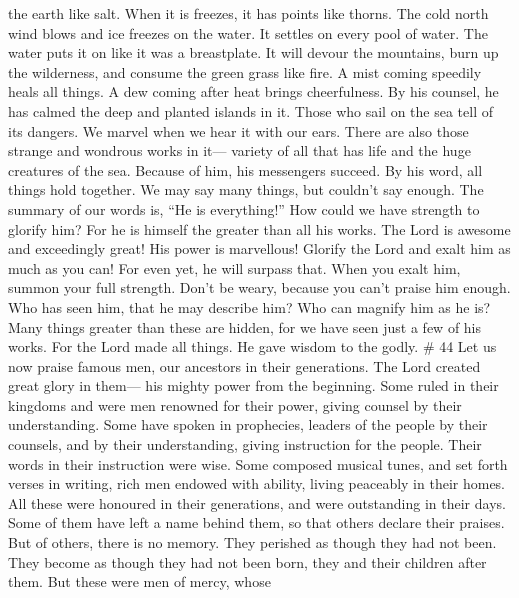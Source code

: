 the earth like salt. When it is freezes, it has points like thorns.
 The cold north wind blows and ice freezes on the water. It
settles on every pool of water. The water puts it on like it was a
breastplate.  It will devour the mountains, burn up the
wilderness, and consume the green grass like fire.  A mist
coming speedily heals all things. A dew coming after heat brings
cheerfulness.  By his counsel, he has calmed the deep and
planted islands in it.  Those who sail on the sea tell of
its dangers. We marvel when we hear it with our ears. 
There are also those strange and wondrous works in it--- variety of all
that has life and the huge creatures of the sea.  Because
of him, his messengers succeed. By his word, all things hold together.
 We may say many things, but couldn't say enough. The
summary of our words is, ``He is everything!''  How could
we have strength to glorify him? For he is himself the greater than all
his works.  The Lord is awesome and exceedingly great! His
power is marvellous!  Glorify the Lord and exalt him as
much as you can! For even yet, he will surpass that. When you exalt him,
summon your full strength. Don't be weary, because you can't praise him
enough.  Who has seen him, that he may describe him? Who
can magnify him as he is?  Many things greater than these
are hidden, for we have seen just a few of his works.  For
the Lord made all things. He gave wisdom to the godly. \# 44
 Let us now praise famous men, our ancestors in their
generations.  The Lord created great glory in them--- his
mighty power from the beginning.  Some ruled in their
kingdoms and were men renowned for their power, giving counsel by their
understanding. Some have spoken in prophecies,  leaders of
the people by their counsels, and by their understanding, giving
instruction for the people. Their words in their instruction were wise.
 Some composed musical tunes, and set forth verses in
writing,  rich men endowed with ability, living peaceably in
their homes.  All these were honoured in their generations,
and were outstanding in their days.  Some of them have left
a name behind them, so that others declare their praises. 
But of others, there is no memory. They perished as though they had not
been. They become as though they had not been born, they and their
children after them.  But these were men of mercy, whose
